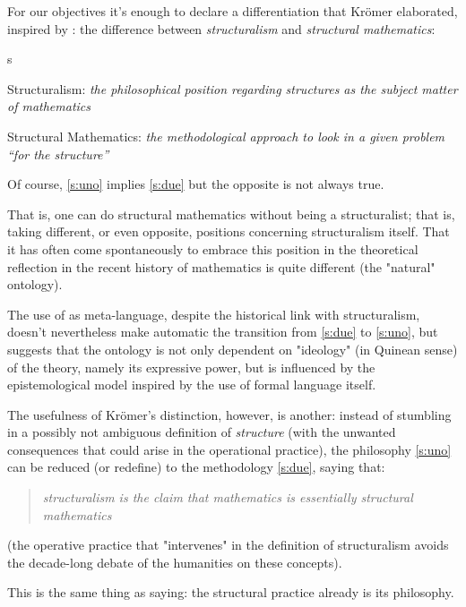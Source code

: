 For our objectives it's enough to declare a differentiation that Kr\"omer
elaborated, inspired by \cite{Cor96}: the difference between \emph{structuralism} and \emph{structural mathematics}:
\begin{enumtag}{s}
    \item \label{s:uno} Structuralism: \textit{the philosophical
        position regarding structures as the subject matter of mathematics}
    \item \label{s:due} Structural Mathematics: \textit{the methodological approach to look in a given problem
        “for the structure”}
\end{enumtag}
\begin{remark} \label{weak_structuralism}
    Of course, \ref{s:uno} implies \ref{s:due} but the opposite is not always true.

    That is, one can do structural mathematics without being a structuralist; that is, taking different, or even opposite, positions concerning structuralism itself. That it has often come spontaneously to embrace this position in the theoretical reflection in the recent history of mathematics is quite different (the "natural" ontology).

    The use of  as meta-language, despite the historical link with structuralism, doesn't nevertheless make automatic the transition from
    \ref{s:due} to  \ref{s:uno}, but suggests that the ontology is not only
    dependent on "ideology" (in Quinean sense) of the theory, namely its expressive power, but is influenced by the epistemological model inspired by the use of formal language itself.
\end{remark}
The usefulness of Kr\"omer's distinction, however, is another: instead of stumbling in a possibly not ambiguous definition of \textit{structure} (with the unwanted consequences that could arise in the operational practice), the philosophy \ref{s:uno} can be reduced (or redefine) to the methodology \ref{s:due}, saying that:
\begin{quote}
    \emph{structuralism is the claim that mathematics
        is essentially structural mathematics} \cite{kromer2007tool}
\end{quote}
(the operative practice that "intervenes" in the definition of structuralism avoids the decade-long debate of the humanities on these concepts).

This is the same thing as saying: the structural practice already is its philosophy.

